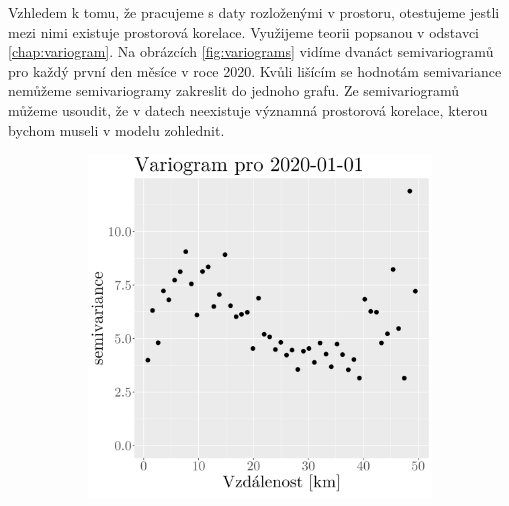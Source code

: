 Vzhledem k tomu, že pracujeme s daty rozloženými v prostoru, otestujeme jestli mezi nimi existuje prostorová korelace. Využijeme teorii popsanou v odstavci \ref{chap:variogram}. Na obrázcích \ref{fig:variograms} vidíme dvanáct semivariogramů pro každý první den měsíce v roce 2020. Kvůli lišícím se hodnotám semivariance nemůžeme semivariogramy zakreslit do jednoho grafu. Ze semivariogramů můžeme usoudit, že v datech neexistuje významná prostorová korelace, kterou bychom museli v modelu zohlednit.

\begin{figure}
	\centering
	\begin{subfigure}{0.30\textwidth}
		\includegraphics[width=\textwidth]{img/ch2/variograms/variogram_max15cm1.png}
		\caption{}
		\label{fig:variogram1}
	\end{subfigure}
	\hfill
	\begin{subfigure}{0.30\textwidth}

\end{subfigure}
\end{figure}
